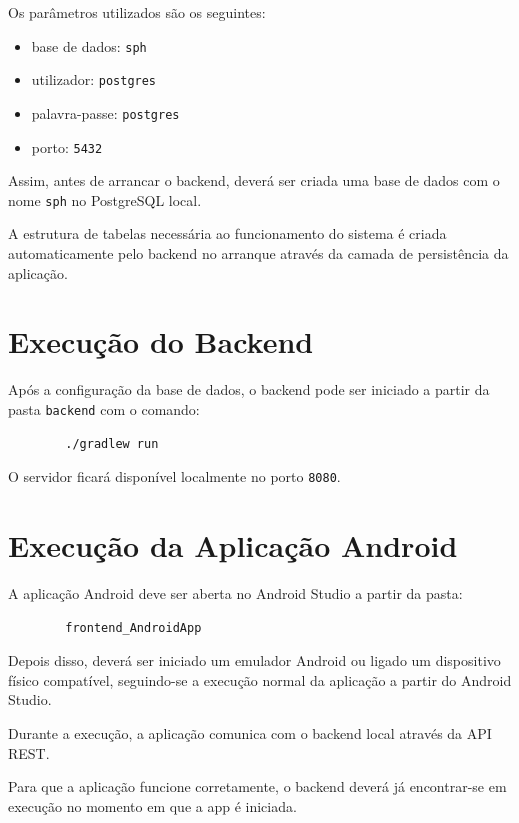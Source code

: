 \documentclass[]{article}
\begin{document}
    Os parâmetros utilizados são os seguintes:

    \begin{itemize}
        \item base de dados: \texttt{sph}
        \item utilizador: \texttt{postgres}
        \item palavra-passe: \texttt{postgres}
        \item porto: \texttt{5432}
    \end{itemize}

    Assim, antes de arrancar o backend, deverá ser criada uma base de dados com o nome \texttt{sph} no PostgreSQL local.

    A estrutura de tabelas necessária ao funcionamento do sistema é criada automaticamente pelo backend no arranque através da camada de persistência da aplicação.

    \section{Execução do Backend}

    Após a configuração da base de dados, o backend pode ser iniciado a partir da pasta \texttt{backend} com o comando:

    \begin{verbatim}
        ./gradlew run
    \end{verbatim}

    O servidor ficará disponível localmente no porto \texttt{8080}.

    \section{Execução da Aplicação Android}

    A aplicação Android deve ser aberta no Android Studio a partir da pasta:

    \begin{verbatim}
        frontend_AndroidApp
    \end{verbatim}

    Depois disso, deverá ser iniciado um emulador Android ou ligado um dispositivo físico compatível, seguindo-se a execução normal da aplicação a partir do Android Studio.

    Durante a execução, a aplicação comunica com o backend local através da API REST.

    Para que a aplicação funcione corretamente, o backend deverá já encontrar-se em execução no momento em que a app é iniciada.
\end{document}

